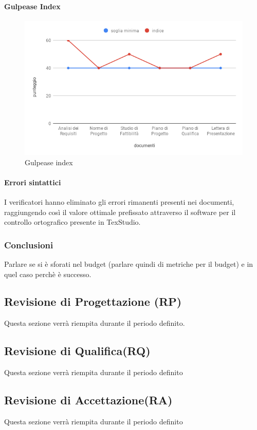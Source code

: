 \paragraph{Gulpease Index}
\hspace{15cm}
\begin{figure}[h!]
	\centering
	\includegraphics[scale=0.5]{GulpeaseIndex.png}
	\caption{Gulpease index}
\end{figure}

\paragraph{Errori sintattici}
\hspace{15cm}
 I verificatori hanno eliminato gli errori rimanenti presenti nei documenti, raggiungendo così il valore ottimale prefissato attraverso il software per il controllo ortografico presente in TexStudio. 
\subsubsection{Conclusioni}
Parlare se si è sforati nel budget (parlare quindi di metriche per il budget) e in quel caso perchè è successo.
\clearpage
\subsection{Revisione di Progettazione (RP)}
Questa sezione verrà riempita durante il periodo definito.
\subsection{Revisione di Qualifica(RQ)}
Questa sezione verrà riempita durante il periodo definito
\subsection{Revisione di Accettazione(RA)}
Questa sezione verrà riempita durante il periodo definito